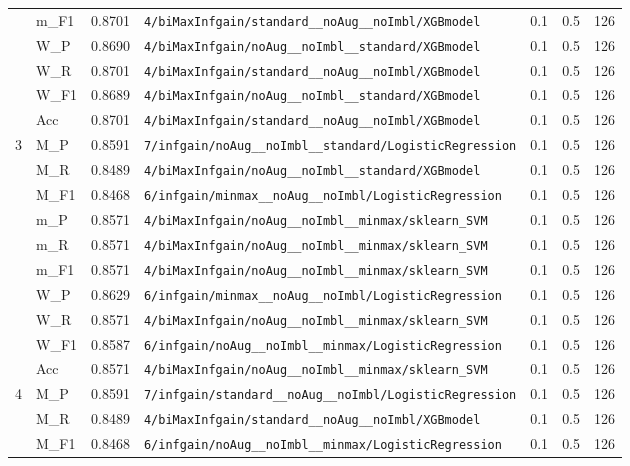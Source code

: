 \begin{table}[htbp]
\begin{tabular}{|c|l|c|>{\ttfamily\footnotesize}p{7.2cm}|c|c|c|}
 & m\_F1 & 0.8701 & \texttt{4/biMaxInfgain/standard\_\_noAug\_\_noImbl/XGBmodel} & 0.1 & 0.5  & 126 \\ 
 & W\_P & 0.8690 & \texttt{4/biMaxInfgain/noAug\_\_noImbl\_\_standard/XGBmodel} & 0.1 & 0.5  & 126 \\ 
 & W\_R & 0.8701 & \texttt{4/biMaxInfgain/standard\_\_noAug\_\_noImbl/XGBmodel} & 0.1 & 0.5  & 126 \\ 
 & W\_F1 & 0.8689 & \texttt{4/biMaxInfgain/noAug\_\_noImbl\_\_standard/XGBmodel} & 0.1 & 0.5  & 126 \\ 
 & Acc & 0.8701 & \texttt{4/biMaxInfgain/standard\_\_noAug\_\_noImbl/XGBmodel} & 0.1 & 0.5  & 126 \\ 
\hline
\multirow{10}{*}{3} & M\_P & 0.8591 & \texttt{7/infgain/noAug\_\_noImbl\_\_standard/LogisticRegression} & 0.1 & 0.5  & 126 \\ 
 & M\_R & 0.8489 & \texttt{4/biMaxInfgain/noAug\_\_noImbl\_\_standard/XGBmodel} & 0.1 & 0.5  & 126 \\ 
 & M\_F1 & 0.8468 & \texttt{6/infgain/minmax\_\_noAug\_\_noImbl/LogisticRegression} & 0.1 & 0.5  & 126 \\ 
 & m\_P & 0.8571 & \texttt{4/biMaxInfgain/noAug\_\_noImbl\_\_minmax/sklearn\_SVM} & 0.1 & 0.5  & 126 \\ 
 & m\_R & 0.8571 & \texttt{4/biMaxInfgain/noAug\_\_noImbl\_\_minmax/sklearn\_SVM} & 0.1 & 0.5  & 126 \\ 
 & m\_F1 & 0.8571 & \texttt{4/biMaxInfgain/noAug\_\_noImbl\_\_minmax/sklearn\_SVM} & 0.1 & 0.5  & 126 \\ 
 & W\_P & 0.8629 & \texttt{6/infgain/minmax\_\_noAug\_\_noImbl/LogisticRegression} & 0.1 & 0.5  & 126 \\ 
 & W\_R & 0.8571 & \texttt{4/biMaxInfgain/noAug\_\_noImbl\_\_minmax/sklearn\_SVM} & 0.1 & 0.5  & 126 \\ 
 & W\_F1 & 0.8587 & \texttt{6/infgain/noAug\_\_noImbl\_\_minmax/LogisticRegression} & 0.1 & 0.5  & 126 \\ 
 & Acc & 0.8571 & \texttt{4/biMaxInfgain/noAug\_\_noImbl\_\_minmax/sklearn\_SVM} & 0.1 & 0.5  & 126 \\ 
\hline
\multirow{10}{*}{4} & M\_P & 0.8591 & \texttt{7/infgain/standard\_\_noAug\_\_noImbl/LogisticRegression} & 0.1 & 0.5  & 126 \\ 
 & M\_R & 0.8489 & \texttt{4/biMaxInfgain/standard\_\_noAug\_\_noImbl/XGBmodel} & 0.1 & 0.5  & 126 \\ 
 & M\_F1 & 0.8468 & \texttt{6/infgain/noAug\_\_noImbl\_\_minmax/LogisticRegression} & 0.1 & 0.5  & 126 \\ 

\end{tabular}
\end{table}
